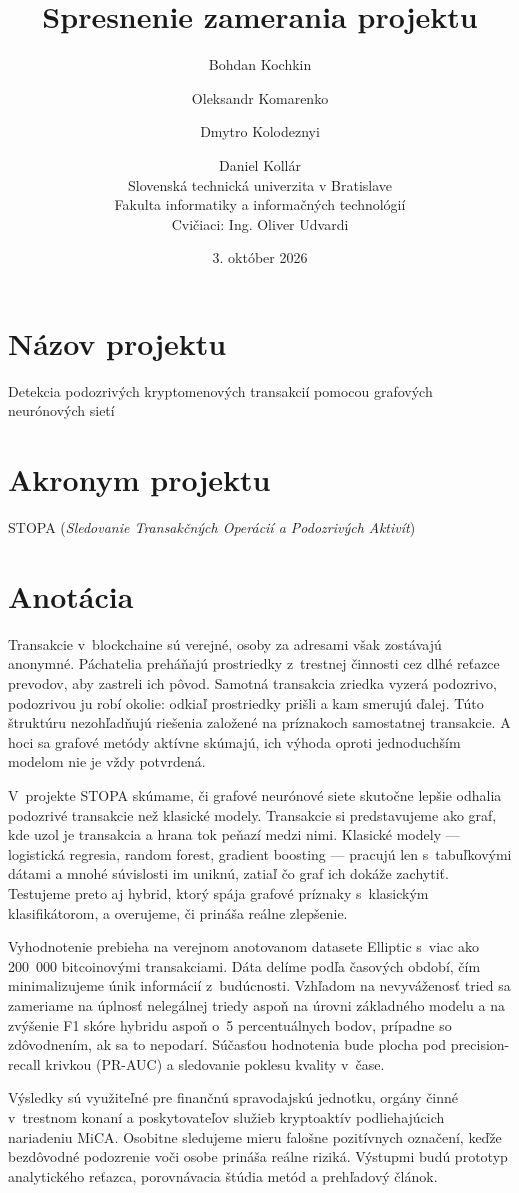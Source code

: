 \documentclass[11pt,a4paper,slovak]{article}
\title{Spresnenie zamerania projektu}
\author{Bohdan Kochkin \and Oleksandr Komarenko \and Dmytro Kolodeznyi \and Daniel Kollár\\[6pt]
	{\small Slovenská technická univerzita v Bratislave}\\
	{\small Fakulta informatiky a informačných technológií}\\[4pt]
	{\small Cvičiaci: Ing. Oliver Udvardi}
	}
\date{\small 3. október 2026}
\begin{document}
\maketitle

\section*{Názov projektu}

Detekcia podozrivých kryptomenových transakcií pomocou grafových neurónových
sietí

\section*{Akronym projektu}

STOPA (\emph{Sledovanie Transakčných Operácií a Podozrivých Aktivít})

\section*{Anotácia}

Transakcie v~blockchaine sú verejné, osoby za adresami však zostávajú anonymné.
Páchatelia preháňajú prostriedky z~trestnej činnosti cez dlhé reťazce prevodov,
aby zastreli ich pôvod. Samotná transakcia zriedka vyzerá podozrivo, podozrivou
ju robí okolie: odkiaľ prostriedky prišli a kam smerujú ďalej. Túto štruktúru
nezohľadňujú riešenia založené na príznakoch samostatnej transakcie. A hoci sa
grafové metódy aktívne skúmajú, ich výhoda oproti jednoduchším modelom nie je
vždy potvrdená.

V~projekte STOPA skúmame, či grafové neurónové siete skutočne lepšie odhalia
podozrivé transakcie než klasické modely. Transakcie si predstavujeme ako graf,
kde uzol je transakcia a hrana tok peňazí medzi nimi. Klasické modely ---
logistická regresia, random forest, gradient boosting --- pracujú len
s~tabuľkovými dátami a mnohé súvislosti im uniknú, zatiaľ čo graf ich dokáže
zachytiť. Testujeme preto aj hybrid, ktorý spája grafové príznaky s~klasickým
klasifikátorom, a overujeme, či prináša reálne zlepšenie.

Vyhodnotenie prebieha na verejnom anotovanom datasete Elliptic s~viac ako
200~000 bitcoinovými transakciami. Dáta delíme podľa časových období, čím
minimalizujeme únik informácií z~budúcnosti. Vzhľadom na nevyváženosť tried sa zameriame na úplnosť nelegálnej
triedy aspoň na úrovni základného modelu a na zvýšenie F1 skóre hybridu aspoň
o~5 percentuálnych bodov, prípadne so zdôvodnením, ak sa to nepodarí. Súčasťou
hodnotenia bude plocha pod precision-recall krivkou (PR-AUC) a sledovanie
poklesu kvality v~čase.

Výsledky sú využiteľné pre finančnú spravodajskú jednotku, orgány činné
v~trestnom konaní a poskytovateľov služieb kryptoaktív podliehajúcich nariadeniu
MiCA. Osobitne sledujeme mieru falošne pozitívnych označení, keďže bezdôvodné
podozrenie voči osobe prináša reálne riziká. Výstupmi budú prototyp analytického
reťazca, porovnávacia štúdia metód a prehľadový článok.
\end{document}
